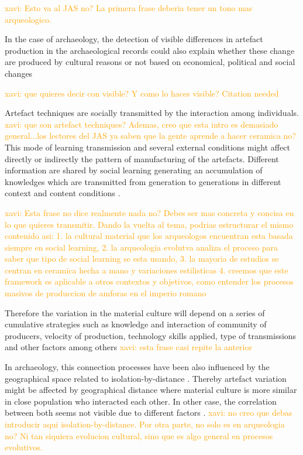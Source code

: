 \documentclass[review]{elsarticle}
\newcommand{\memo}[2]{\textcolor{#1}{#2}}
\newcommand{\xavi}[1]{\memo{orange}{xavi: #1\\}}
\begin{document}
\xavi{Esto va al JAS no? La primera frase deberia tener un tono mas arqueologico.}

In the case of archaeology, the detection of visible differences in artefact production in the archaeological records could also explain whether these change are produced by cultural reasons or not based on economical, political and social changes %

\xavi{que quieres decir con visible? Y como lo haces visible? Citation needed}


Artefact techniques are socially transmitted by the interaction among individuals. \xavi{que son artefact techniques? Ademas, creo que esta intro es demasiado general...los lectores del JAS ya saben que la gente aprende a hacer ceramica no?}
This mode of learning transmission and several external conditions might affect directly or indirectly the pattern of manufacturing of the artefacts. Different information are shared by social learning generating an accumulation of knowledges which are transmitted from generation to generations in different context and content conditions  \citep{eerkens_jelmer_cultural_2005, neff1992ceramics,henrich_evolution_2003, boyd_cultural_2011}. 

\xavi{Esta frase no dice realmente nada no? Debes ser mas concreta y concisa en lo que quieres transmitir. Dando la vuelta al tema, podrias estructurar el mismo contenido asi: 1. la cultural material que los arqueologos encuentran esta basada siempre en social learning, 2. la arqueologia evolutva analiza el proceso para saber que tipo de social learning se esta usando, 3. la mayoria de estudios se centran en ceramica hecha a mano y variaciones estilisticas 4. creemos que este framework es aplicable a otros contextos y objetivos, como entender los procesos masivos de produccion de amforas en el imperio romano}

Therefore the variation in the material culture will depend on a series of cumulative strategies such as knowledge and interaction of community of producers, velocity of production, technology skills applied, type of transmissions and other factors among others %
\xavi{esta frase casi repite la anterior}

In archaeology, this connection processes have been also influenced by the geographical space related to isolation-by-distance \citep{bjorklund_effect_2010,shennan_isolation-by-distance_2015, van_strien_isolation-by-distance_2015}. Thereby artefact variation might be affected by geographical distance where material culture is more similar in close population who interacted each other. In other case, the correlation between both seems not visible due to different factors \citep{hart_effects_2012}. 
\xavi{no creo que debas introducir aqui isolation-by-distance. Por otra parte, no solo es en arqueologia no? Ni tan siquiera evolucion cultural, sino que es algo general en procesos evolutivos.}
\end{document}
